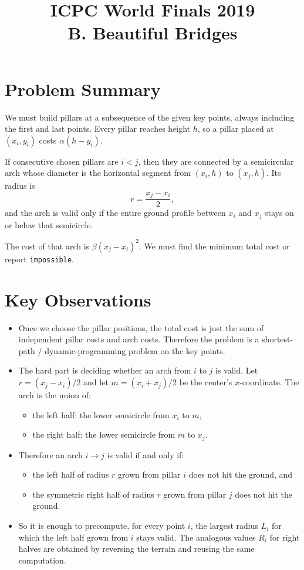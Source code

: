 \documentclass[11pt]{article}
\title{ICPC World Finals 2019\\B. Beautiful Bridges}
\author{}
\date{}
\begin{document}
\maketitle

\section*{Problem Summary}

We must build pillars at a subsequence of the given key points, always including the first and last points. Every pillar reaches height $h$, so a pillar placed at $(x_i, y_i)$ costs $\alpha (h - y_i)$.

If consecutive chosen pillars are $i < j$, then they are connected by a semicircular arch whose diameter is the horizontal segment from $(x_i, h)$ to $(x_j, h)$. Its radius is
\[
r = \frac{x_j - x_i}{2},
\]
and the arch is valid only if the entire ground profile between $x_i$ and $x_j$ stays on or below that semicircle.

The cost of that arch is $\beta (x_j - x_i)^2$. We must find the minimum total cost or report \texttt{impossible}.

\section*{Key Observations}

\begin{itemize}[leftmargin=*]
    \item Once we choose the pillar positions, the total cost is just the sum of independent pillar costs and arch costs. Therefore the problem is a shortest-path / dynamic-programming problem on the key points.
    \item The hard part is deciding whether an arch from $i$ to $j$ is valid. Let $r = (x_j - x_i)/2$ and let $m = (x_i + x_j)/2$ be the center's $x$-coordinate. The arch is the union of:
    \begin{itemize}[leftmargin=*]
        \item the left half: the lower semicircle from $x_i$ to $m$,
        \item the right half: the lower semicircle from $m$ to $x_j$.
    \end{itemize}
    \item Therefore an arch $i \to j$ is valid if and only if:
    \begin{itemize}[leftmargin=*]
        \item the left half of radius $r$ grown from pillar $i$ does not hit the ground, and
        \item the symmetric right half of radius $r$ grown from pillar $j$ does not hit the ground.
    \end{itemize}
    \item So it is enough to precompute, for every point $i$, the largest radius $L_i$ for which the left half grown from $i$ stays valid. The analogous values $R_i$ for right halves are obtained by reversing the terrain and reusing the same computation.
\end{itemize}
\end{document}
